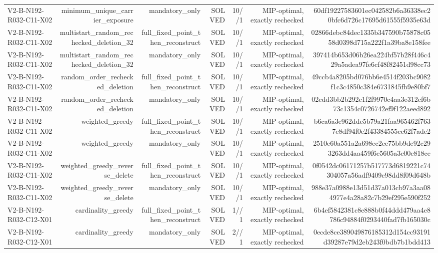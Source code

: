 {\begin{longtable}{lrrrrrr}
V2-B-N192-R032-C11-X02 & minimum\_unique\_carrier\_exposure & mandatory\_only & SOLVED & 10//1 & MIP-optimal, exactly rechecked & 60df19227583601ec042582b6a36338ec20bfc6d726c17695d61555f5935e63d \\
V2-B-N192-R032-C11-X02 & multistart\_random\_rechecked\_deletion\_32 & full\_fixed\_point\_then\_reconstruct & SOLVED & 10//1 & MIP-optimal, exactly rechecked & 02866debc84dec1335b347590b75878c0558d0398d715a222f1a39ba8e158fee \\
V2-B-N192-R032-C11-X02 & multistart\_random\_rechecked\_deletion\_32 & mandatory\_only & SOLVED & 10//1 & MIP-optimal, exactly rechecked & 397414b653d06b26ea224bf57b28f446c429a5adea97fe6cf48f82451d98cc73 \\
V2-B-N192-R032-C11-X02 & random\_order\_rechecked\_deletion & full\_fixed\_point\_then\_reconstruct & SOLVED & 10//1 & MIP-optimal, exactly rechecked & 49ccb4a8205bd076bb6e4514f203bc9082f1c3c4850c384e6731845fb9e80bf7 \\
V2-B-N192-R032-C11-X02 & random\_order\_rechecked\_deletion & mandatory\_only & SOLVED & 10//1 & MIP-optimal, exactly rechecked & 02cdd3bb2b292c1f2f9970c4aa3e312cf6b73c1354c0726742ef9f122aeed892 \\
V2-B-N192-R032-C11-X02 & weighted\_greedy & full\_fixed\_point\_then\_reconstruct & SOLVED & 10//1 & MIP-optimal, exactly rechecked & b6ca6a3e962dde5b79a21faa965462f7637e8df94f0e2f43384555cc62f7ade2 \\
V2-B-N192-R032-C11-X02 & weighted\_greedy & mandatory\_only & SOLVED & 10//1 & MIP-optimal, exactly rechecked & 2510e60a551a2a698ec2ce75bb9de92c293263dd4aa459f6e5605a3e00e818ce \\
V2-B-N192-R032-C11-X02 & weighted\_greedy\_reverse\_delete & full\_fixed\_point\_then\_reconstruct & SOLVED & 10//1 & MIP-optimal, exactly rechecked & 0f0542dc06171257b517773d6819221c74304057a56adf9409c98dd8f09d648b \\
V2-B-N192-R032-C11-X02 & weighted\_greedy\_reverse\_delete & mandatory\_only & SOLVED & 10//1 & MIP-optimal, exactly rechecked & 988e37a0988e13d51d37a013cb97a3aa084977e4a28a82c7b29ef295e590f252 \\
V2-B-N192-R032-C12-X01 & cardinality\_greedy & full\_fixed\_point\_then\_reconstruct & SOLVED & 1//1 & MIP-optimal, exactly rechecked & 6b4ef5842381c8e888b0f44ddd479aa4e8786c94884f0293440fad7fb165030c \\
V2-B-N192-R032-C12-X01 & cardinality\_greedy & mandatory\_only & SOLVED & 2//1 & MIP-optimal, exactly rechecked & 0ecde8ce389049876185312d154cc93191d39287e79d2eb243f0bdb7b1bdd413 \\

\end{longtable}}
